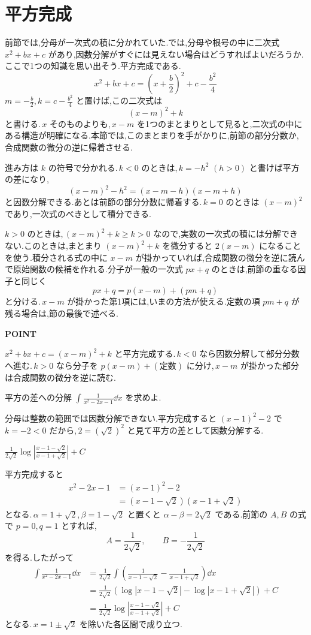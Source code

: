 \section{平方完成}\label{節:平方完成と積分}

前節では,分母が一次式の積に分かれていた.では,分母や根号の中に二次式 $x^2+bx+c$ があり,因数分解がすぐには見えない場合はどうすればよいだろうか.ここで1つの知識を思い出そう.平方完成である.
\[
 x^2+bx+c=\left(x+\frac b2\right)^2+c-\frac{b^2}4
\]
$m=-\frac b2$,\,$k=c-\frac{b^2}4$ と置けば,この二次式は
\[
 (x-m)^2+k
\]
と書ける.\,$x$ そのものよりも,\,$x-m$ を1つのまとまりとして見ると,二次式の中にある構造が明確になる.本節では,このまとまりを手がかりに,前節の部分分数か,合成関数の微分の逆に帰着させる.

進み方は $k$ の符号で分かれる.\,$k<0$ のときは,\,$k=-h^2$ $(h>0)$ と書けば平方の差になり,
\[
 (x-m)^2-h^2=(x-m-h)(x-m+h)
\]
と因数分解できる.あとは前節の部分分数に帰着する.\,$k=0$ のときは $(x-m)^2$ であり,一次式のべきとして積分できる.

$k>0$ のときは,\,$(x-m)^2+k\ge k>0$ なので,実数の一次式の積には分解できない.このときは,まとまり $(x-m)^2+k$ を微分すると $2(x-m)$ になることを使う.積分される式の中に $x-m$ が掛かっていれば,合成関数の微分を逆に読んで原始関数の候補を作れる.分子が一般の一次式 $px+q$ のときは,前節の重なる因子と同じく
\[
 px+q=p(x-m)+(pm+q)
\]
と分ける.\,$x-m$ が掛かった第1項には,いまの方法が使える.定数の項 $pm+q$ が残る場合は,節の最後で述べる.

\begin{bookpoint}
\textbf{POINT}\par
$x^2+bx+c=(x-m)^2+k$ と平方完成する.\,$k<0$ なら因数分解して部分分数へ進む.\,$k>0$ なら分子を $p(x-m)+(\text{定数})$ に分け,\,$x-m$ が掛かった部分は合成関数の微分を逆に読む.
\end{bookpoint}

\begin{example}{平方の差への分解}
$\int\frac{1}{x^2-2x-1}\dd x$ を求めよ.
\end{example}

分母は整数の範囲では因数分解できない.平方完成すると $(x-1)^2-2$ で $k=-2<0$ だから,\,$2=(\sqrt2)^2$ と見て平方の差として因数分解する.

$\frac1{2\sqrt2}\log\left|\frac{x-1-\sqrt2}{x-1+\sqrt2}\right|+C$

平方完成すると
\begin{align*}
 x^2-2x-1&=(x-1)^2-2\\
 &=(x-1-\sqrt2)(x-1+\sqrt2)
\end{align*}
となる.\,$\alpha=1+\sqrt2$,\,$\beta=1-\sqrt2$ と置くと $\alpha-\beta=2\sqrt2$ である.前節の $A,B$ の式で $p=0$,\,$q=1$ とすれば,
\[
 A=\frac1{2\sqrt2},\qquad B=-\frac1{2\sqrt2}
\]
を得る.したがって
\begin{align*}
 \int\frac{1}{x^2-2x-1}\dd x
 &=\frac1{2\sqrt2}\int\left(\frac1{x-1-\sqrt2}-\frac1{x-1+\sqrt2}\right)\dd x\\
 &=\frac1{2\sqrt2}\left(\log|x-1-\sqrt2|-\log|x-1+\sqrt2|\right)+C\\
 &=\frac1{2\sqrt2}\log\left|\frac{x-1-\sqrt2}{x-1+\sqrt2}\right|+C
\end{align*}
となる.\,$x=1\pm\sqrt2$ を除いた各区間で成り立つ.

